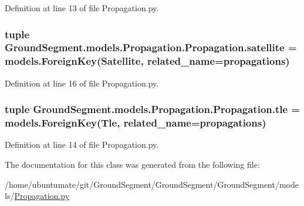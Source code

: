 Definition at line 13 of file Propagation.\+py.

\hypertarget{class_ground_segment_1_1models_1_1_propagation_1_1_propagation_a7217452ef0db1bd8ed4a3d113d8bc276}{}
\subsubsection[{satellite}]{\setlength{\rightskip}{0pt plus 5cm}tuple Ground\+Segment.\+models.\+Propagation.\+Propagation.\+satellite = models.\+Foreign\+Key({\bf Satellite}, related\+\_\+name=\textquotesingle{}propagations\textquotesingle{})\hspace{0.3cm}{\ttfamily [static]}}\label{class_ground_segment_1_1models_1_1_propagation_1_1_propagation_a7217452ef0db1bd8ed4a3d113d8bc276}


Definition at line 16 of file Propagation.\+py.

\hypertarget{class_ground_segment_1_1models_1_1_propagation_1_1_propagation_a1a194d19e265f4453b3cee0808202e09}{}
\subsubsection[{tle}]{\setlength{\rightskip}{0pt plus 5cm}tuple Ground\+Segment.\+models.\+Propagation.\+Propagation.\+tle = models.\+Foreign\+Key({\bf Tle}, related\+\_\+name=\textquotesingle{}propagations\textquotesingle{})\hspace{0.3cm}{\ttfamily [static]}}\label{class_ground_segment_1_1models_1_1_propagation_1_1_propagation_a1a194d19e265f4453b3cee0808202e09}


Definition at line 14 of file Propagation.\+py.



The documentation for this class was generated from the following file\+:\begin{DoxyCompactItemize}
\item 
/home/ubuntumate/git/\+Ground\+Segment/\+Ground\+Segment/\+Ground\+Segment/models/\hyperlink{_propagation_8py}{Propagation.\+py}\end{DoxyCompactItemize}
